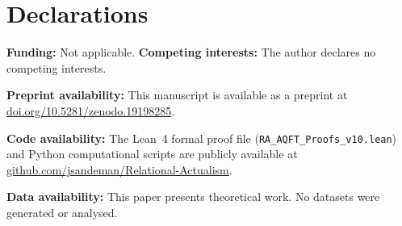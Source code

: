 \documentclass[11pt,a4paper]{article}
\theoremstyle{plain}
\theoremstyle{definition}
\theoremstyle{remark}
\begin{document}
\section*{Declarations}
\textbf{Funding:} Not applicable.\quad
\textbf{Competing interests:} The author declares no competing interests.

\textbf{Preprint availability:} This manuscript is available as a preprint at
\href{https://doi.org/10.5281/zenodo.19198285}{doi.org/10.5281/zenodo.19198285}.

\textbf{Code availability:} The Lean~4 formal proof file (\texttt{RA\_AQFT\_Proofs\_v10.lean}) and Python computational scripts are publicly available at \href{https://github.com/jsandeman/Relational-Actualism}{github.com/jsandeman/Relational-Actualism}.

\textbf{Data availability:} This paper presents theoretical work. No datasets
were generated or analysed.
\end{document}
